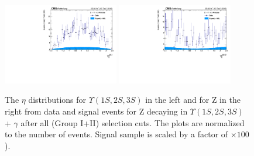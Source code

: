\begin{figure}[!htbp]
\begin{center}
\includegraphics[width=0.45\textwidth]{figures/outputPlots/ZtoUpsilon_Cat0_ZZZZZ/nEvts/data_x_mc/withKinCuts/h_withKin_Upsilon_eta}\hspace*{1.cm}
\includegraphics[width=0.45\textwidth]{figures/outputPlots/ZtoUpsilon_Cat0_ZZZZZ/nEvts/data_x_mc/withKinCuts/h_withKin_Z_eta}
\end{center}\vspace*{-.5cm}
\caption{The $\eta$ distributions for $\Upsilon(1S,2S,3S)$ in the left and for Z in the right from data and signal events for Z decaying in $\Upsilon(1S,2S,3S)$ + $\gamma$ after all (Group I+II) selection cuts. The plots are normalized to the number of events. Signal sample is scaled by a factor of $\times 100$).}
\label{fig:etaUpsilon_and_Z_ZtoUpsilon_Cat0_groupI_plus_II}
\end{figure}


